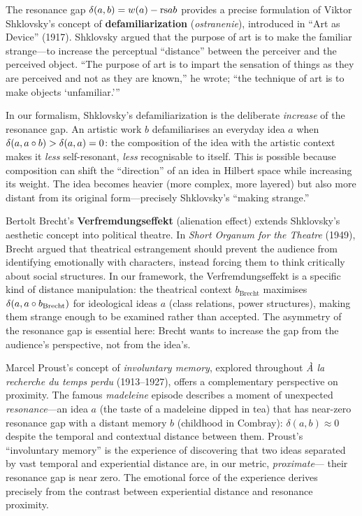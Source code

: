 \begin{interpretation}
\label{interp:ch11:shklovsky_defamiliarization}
The resonance gap $\delta(a, b) = w(a) - \mathrm{rs}{a}{b}$ provides a precise
formulation of Viktor Shklovsky's concept of \textbf{defamiliarization}
(\emph{ostranenie}), introduced in ``Art as Device'' (1917).  Shklovsky
argued that the purpose of art is to make the familiar strange---to increase
the perceptual ``distance'' between the perceiver and the perceived object.
``The purpose of art is to impart the sensation of things as they are
perceived and not as they are known,'' he wrote; ``the technique of art is
to make objects `unfamiliar.'\thinspace''

In our formalism, Shklovsky's defamiliarization is the deliberate
\emph{increase} of the resonance gap.  An artistic work $b$ defamiliarises
an everyday idea $a$ when $\delta(a, a \circ b) > \delta(a, a) = 0$:
the composition of the idea with the artistic context makes it \emph{less}
self-resonant, \emph{less} recognisable to itself.  This is possible because
composition can shift the ``direction'' of an idea in Hilbert space while
increasing its weight.  The idea becomes heavier (more complex, more
layered) but also more distant from its original form---precisely
Shklovsky's ``making strange.''

Bertolt Brecht's \textbf{Verfremdungseffekt} (alienation effect) extends
Shklovsky's aesthetic concept into political theatre.  In \emph{Short
Organum for the Theatre} (1949), Brecht argued that theatrical estrangement
should prevent the audience from identifying emotionally with characters,
instead forcing them to think critically about social structures.  In our
framework, the Verfremdungseffekt is a specific kind of distance
manipulation: the theatrical context $b_{\mathrm{Brecht}}$ maximises
$\delta(a, a \circ b_{\mathrm{Brecht}})$ for ideological ideas $a$
(class relations, power structures), making them strange enough to be
examined rather than accepted.  The asymmetry of the resonance gap is
essential here: Brecht wants to increase the gap from the audience's
perspective, not from the idea's.

Marcel Proust's concept of \emph{involuntary memory}, explored throughout
\emph{\`A la recherche du temps perdu} (1913--1927), offers a complementary
perspective on proximity.  The famous \emph{madeleine} episode describes a
moment of unexpected \emph{resonance}---an idea $a$ (the taste of a
madeleine dipped in tea) that has near-zero resonance gap with a distant
memory $b$ (childhood in Combray): $\delta(a, b) \approx 0$ despite the
temporal and contextual distance between them.  Proust's ``involuntary
memory'' is the experience of discovering that two ideas separated by vast
temporal and experiential distance are, in our metric, \emph{proximate}---
their resonance gap is near zero.  The emotional force of the experience
derives precisely from the contrast between experiential distance and
resonance proximity.
\end{interpretation}



